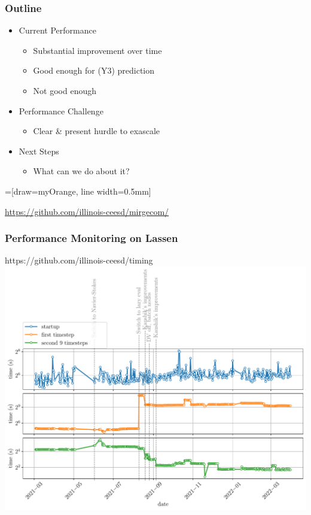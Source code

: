 \begin{frame}\frametitle{Outline}
\begin{minipage}[T]{0.45\textwidth}
  \begin{itemize}
    \setlength{\itemsep}{0.2in}
    \item Current \ceesdcode{} Performance
    \begin{itemize}
    \item Substantial improvement over time
    \item Good enough for (Y3) prediction
    \item Not good enough
    \end{itemize}
    \item Performance Challenge
    \begin{itemize}
    \item Clear \& present hurdle to exascale
    \end{itemize}
    \item Next Steps
    \begin{itemize}
    \item What can we do about it?
    \end{itemize}
  \end{itemize}
\end{minipage}
\hfill
\begin{minipage}[T]{0.45\textwidth}
  \centering
  =[draw=myOrange, line width=0.5mm]
  \softwaredeps%
\end{minipage}
  \url{https://github.com/illinois-ceesd/mirgecom/}
\end{frame}


\begin{frame}\frametitle{Performance Monitoring on Lassen}
\begin{center}
https://github.com/illinois-ceesd/timing\\
\includegraphics[width=.6\textwidth]{Figures/mtc/big_nozzle_timing_history.pdf}
\end{center}
\end{frame}



